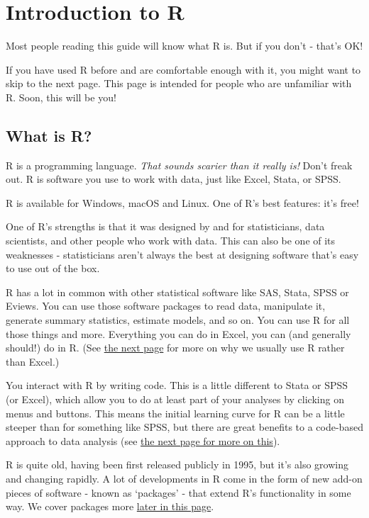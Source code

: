 \documentclass[]{book}
\begin{document}
\hypertarget{introduction-to-r}{%
\chapter{Introduction to R}\label{introduction-to-r}}

Most people reading this guide will know what R is. But if you don't - that's OK!

If you have used R before and are comfortable enough with it, you might want to skip to the next page. This page is intended for people who are unfamiliar with R. Soon, this will be you!

\hypertarget{what-is-r}{%
\section{What is R?}\label{what-is-r}}

R is a programming language. \emph{That sounds scarier than it really is!} Don't freak out. R is software you use to work with data, just like Excel, Stata, or SPSS.

R is available for Windows, macOS and Linux. One of R's best features: it's free!

One of R's strengths is that it was designed by and for statisticians, data scientists, and other people who work with data. This can also be one of its weaknesses - statisticians aren't always the best at designing software that's easy to use out of the box.

R has a lot in common with other statistical software like SAS, Stata, SPSS or Eviews. You can use those software packages to read data, manipulate it, generate summary statistics, estimate models, and so on. You can use R for all those things and more. Everything you can do in Excel, you can (and generally should!) do in R. (See \protect\hyperlink{why-script}{the next page} for more on why we usually use R rather than Excel.)

You interact with R by writing code. This is a little different to Stata or SPSS (or Excel), which allow you to do at least part of your analyses by clicking on menus and buttons. This means the initial learning curve for R can be a little steeper than for something like SPSS, but there are great benefits to a code-based approach to data analysis (see \protect\hyperlink{why-script}{the next page for more on this}).

R is quite old, having been first released publicly in 1995, but it's also growing and changing rapidly. A lot of developments in R come in the form of new add-on pieces of software - known as `packages' - that extend R's functionality in some way. We cover packages more \protect\hyperlink{packages}{later in this page}.
\end{document}
